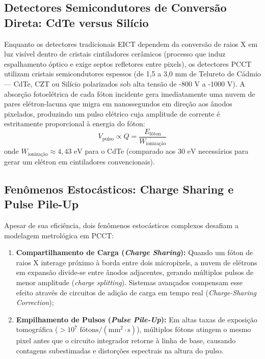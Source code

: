 \subsection{Detectores Semicondutores de Conversão Direta: CdTe versus Silício}
Enquanto os detectores tradicionais EICT dependem da conversão de raios X em luz visível dentro de cristais cintiladores cerâmicos (processo que induz espalhamento óptico e exige septos refletores entre pixels), os detectores PCCT utilizam cristais semicondutores espessos (de 1,5 a 3,0 mm de Telureto de Cádmio --- CdTe, CZT ou Silício polarizados sob alta tensão de -800 V a -1000 V). A absorção fotoelétrica de cada fóton incidente gera imediatamente uma nuvem de pares elétron-lacuna que migra em nanossegundos em direção aos ânodos pixelados, produzindo um pulso elétrico cuja amplitude de corrente é estritamente proporcional à energia do fóton:
\begin{equation}
  V_{\text{pulso}} \propto Q = \frac{E_{\text{fóton}}}{W_{\text{ionização}}}
  \label{eq:vpulso}
\end{equation}
onde $W_{\text{ionização}} \approx 4{,}43 \text{ eV}$ para o CdTe (comparado aos $30 \text{ eV}$ necessários para gerar um elétron em cintiladores convencionais).

\subsection{Fenômenos Estocásticos: Charge Sharing e Pulse Pile-Up}
Apesar de sua eficiência, dois fenômenos estocásticos complexos desafiam a modelagem metrológica em PCCT:
\begin{enumerate}
  \item \textbf{Compartilhamento de Carga (\emph{Charge Sharing}):} Quando um fóton de raios X interage próximo à borda entre dois micropixels, a nuvem de elétrons em expansão divide-se entre ânodos adjacentes, gerando múltiplos pulsos de menor amplitude (\emph{charge splitting}). Sistemas avançados compensam esse efeito através de circuitos de adição de carga em tempo real (\emph{Charge-Sharing Correction});
  \item \textbf{Empilhamento de Pulsos (\emph{Pulse Pile-Up}):} Em altas taxas de exposição tomográfica ($> 10^7 \text{ fótons}/(\text{mm}^2\cdot\text{s})$), múltiplos fótons atingem o mesmo pixel antes que o circuito integrador retorne à linha de base, causando contagens subestimadas e distorções espectrais na altura do pulso.
\end{enumerate}

